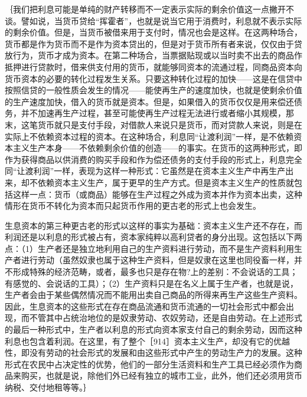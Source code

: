 ｛我们把利息可能是单纯的财产转移而不一定表示实际的剩余价值这一点撇开不谈。譬如说，当货币贷给“挥霍者”，也就是说当它用于消费时，利息就不表示实际的剩余价值。但是，当货币被借来用于支付时，情况也会是这样。在这两种场合，货币都是作为货币而不是作为资本贷出的，但是对于货币所有者来说，仅仅由于贷放行为，货币才成为资本。在第二种场合，当票据贴现或以当时卖不出去的商品作抵押进行贷款时，借来供支付用的货币，就能够同资本的流通过程，同商品资本向货币资本的必要的转化过程发生关系。只要这种转化过程的加快——这是在信贷中按照信贷的一般性质会发生的情况——能使再生产的速度加快，也就是使剩余价值的生产速度加快，借入的货币就是资本。但是，如果借入的货币仅仅是用来偿还债务，并不加速再生产过程，甚至可能使再生产过程无法进行或者缩小其规模，那末，这笔货币就只是支付手段，对借款人来说只是货币，而对贷款人来说，则是在实际上不依赖资本过程的资本。在这种场合，利息同“让渡利润”一样，是不依赖资本主义生产本身——不依赖剩余价值的创造——的事实。在货币的这两种形式，即作为获得商品以供消费的购买手段和作为偿还债务的支付手段的形式上，利息完全同“让渡利润”一样，表现为这样一种形式：它虽然是在资本主义生产中再生产出来，却不依赖资本主义生产，属于更早的生产方式。但是资本主义生产的性质就包括这样一点：货币（或商品）能够在生产过程之外成为资本并作为资本出卖，这种情形在货币不转化为资本而只起货币作用的更古老的形式上也会发生。

生息资本的第三种更古老的形式以这样的事实为基础：资本主义生产还不存在，而利润还是以利息的形式被占有，资本家纯粹以高利贷者的身分出现。这包括以下两点：（1）生产者还是独立地利用自己的生产资料进行劳动，而不是生产资料利用生产者进行劳动（虽然奴隶也属于这种生产资料，但是奴隶在这里也同役畜一样，并不形成特殊的经济范畴，或者，最多也只是存在物?上的差别：不会说话的工具；有感觉的、会说话的工具）；（2）生产资料只是在名义上属于生产者，也就是说，生产者会由于某些偶然情况而不能用出卖自己商品的所得来再生产这些生产资料。因此，生息资本的这些形式在存在商品流通和货币流通的一切社会形式中都会出现，而不管其中占统治地位的是奴隶劳动、农奴劳动，还是自由劳动。在上述形式的最后一种形式中，生产者以利息的形式向资本家支付自己的剩余劳动，因而这种利息也包含着利润。在这里，有了整个［914］资本主义生产，却没有它的优越性，即没有劳动的社会形式的发展和由这些形式中产生的劳动生产力的发展。这种形式在农民中占决定性的优势，他们的一部分生活资料和生产工具已经必须作为商品来购买，也就是说，除他们外已经有独立的城市工业，此外，他们还必须用货币纳税、交付地租等等。｝

